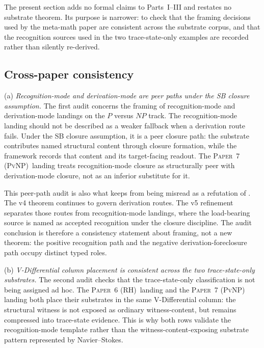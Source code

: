 \documentclass[11pt]{article}
\newcommand{\PaperRH}{\textsc{Paper~6 (RH)}}
\newcommand{\PaperPvNP}{\textsc{Paper~7 (PvNP)}}
\theoremstyle{definition}
\begin{document}
The present section adds no formal claims to Parts~I--III and
restates no substrate theorem.  Its purpose is narrower: to check
that the framing decisions used by the meta-math paper are consistent
across the substrate corpus, and that the recognition sources used in
the two trace-state-only examples are recorded rather than silently
re-derived.

\subsection{Cross-paper consistency}\label{sec:audit:cross-paper-consistency}

(a) \emph{Recognition-mode and derivation-mode are peer paths under the
SB closure assumption.}  The first audit concerns the framing of
recognition-mode and derivation-mode landings on the \(P\) versus \(NP\)
track.  The recognition-mode landing should not be described as a
weaker fallback when a derivation route fails.  Under the SB closure
assumption, it is a peer closure path: the substrate contributes named
structural content through closure formation, while the framework
records that content and its target-facing readout.  The \PaperPvNP\
landing \cite{Tsiokos2026PvNP} treats recognition-mode closure as
structurally peer with derivation-mode closure, not as an inferior
substitute for it.

This peer-path audit is also what keeps 
from being misread as a refutation of \Cref{thm:attack-foreclosure-v4}.
The v4 theorem continues to govern derivation routes.  The v5 refinement
separates those routes from recognition-mode landings, where the
load-bearing source is named as accepted recognition under the closure
discipline.  The audit conclusion is therefore a consistency statement
about framing, not a new theorem: the positive recognition path and the
negative derivation-foreclosure path occupy distinct typed roles.

(b) \emph{V-Differential column placement is consistent across the two
trace-state-only substrates.}  The second audit checks that the
trace-state-only classification is not being assigned ad hoc.  The
\PaperRH\ landing \cite{Tsiokos2026RH} and the \PaperPvNP{} landing both
place their substrates in the same V-Differential column: the structural
witness is not exposed as ordinary witness-content, but remains compressed
into trace-state evidence.  This is why both rows validate the
recognition-mode template rather than the witness-content-exposing
substrate pattern represented by Navier--Stokes.
\end{document}

